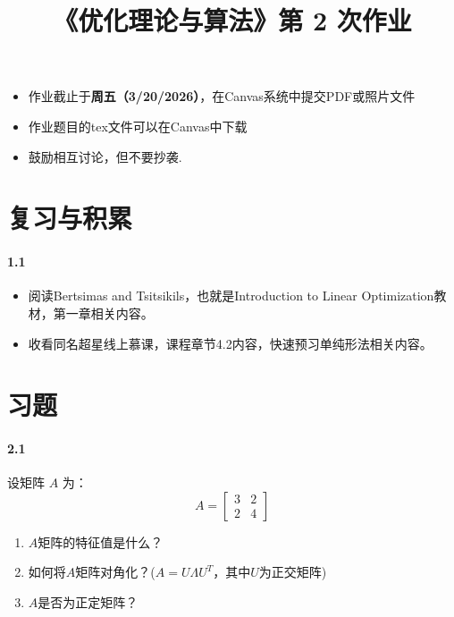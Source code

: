 \documentclass[12pt,a4paper]{article}
\begin{document}
\title{
《优化理论与算法》第 2 次作业
}

\date{}


\maketitle
\maketitle
	\begin{itemize}
\item 作业截止于{\bf 周五（3/20/2026）}，在Canvas系统中提交PDF或照片文件
\item 作业题目的tex文件可以在Canvas中下载
\item 鼓励相互讨论，但不要抄袭.
\end{itemize}
	


\section{复习与积累}
\paragraph{1.1}
\begin{itemize}
\item 阅读Bertsimas and Tsitsikils，也就是Introduction to Linear Optimization教材，第一章相关内容。
\item  收看同名超星线上慕课，课程章节4.2内容，快速预习单纯形法相关内容。
\end{itemize}

\section{习题}


\paragraph{2.1}
设矩阵 $ A $ 为：
\[
A = \begin{bmatrix} 
3 & 2  \\
2 & 4 
\end{bmatrix}
\]

\begin{enumerate}
    \item $A$矩阵的特征值是什么？
    \item 如何将$A$矩阵对角化？($A=U\Lambda U^T$，其中$U$为正交矩阵)
    \item $A$是否为正定矩阵？
\end{enumerate}
	
\end{document}
